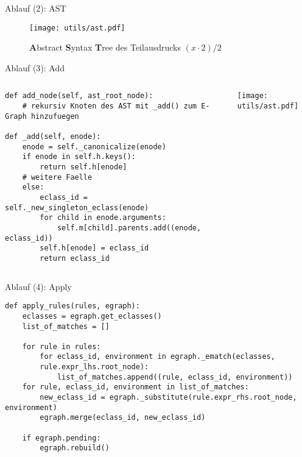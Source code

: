 \begin{frame}{Ablauf (2): AST}
    \begin{figure}[H]
        \centering
        \texttt{[image: utils/ast.pdf]}
        \caption{\textbf{A}bstract \textbf{S}yntax \textbf{T}ree des Teilausdrucks $(x \cdot 2) / 2$}
        \label{fig:komponenten}
    \end{figure}
\end{frame}

\begin{frame}[fragile]{Ablauf (3): Add}
    \begin{columns}[c]
\begin{verbatim}    
def add_node(self, ast_root_node): 
    # rekursiv Knoten des AST mit _add() zum E-Graph hinzufuegen 

def _add(self, enode): 
    enode = self._canonicalize(enode)
    if enode in self.h.keys(): 
        return self.h[enode]
    # weitere Faelle 
    else:
        eclass_id = self._new_singleton_eclass(enode)
        for child in enode.arguments:
            self.m[child].parents.add((enode, eclass_id)) 
        self.h[enode] = eclass_id
        return eclass_id
\end{verbatim}
            \texttt{[image: utils/ast.pdf]}
    \end{columns}
\end{frame}

\begin{frame}[fragile]{Ablauf (4): Apply}
\begin{verbatim}    
def apply_rules(rules, egraph):
    eclasses = egraph.get_eclasses()
    list_of_matches = []

    for rule in rules:
        for eclass_id, environment in egraph._ematch(eclasses, 
        rule.expr_lhs.root_node):
            list_of_matches.append((rule, eclass_id, environment))
    for rule, eclass_id, environment in list_of_matches:
        new_eclass_id = egraph._substitute(rule.expr_rhs.root_node, environment)
        egraph.merge(eclass_id, new_eclass_id)
        
    if egraph.pending:
        egraph.rebuild()
\end{verbatim}
\end{frame}

